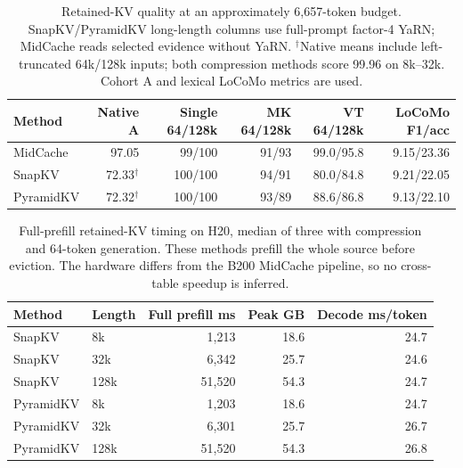 \begin{table}[htbp]
\centering
\small
\setlength{\tabcolsep}{4pt}
\begin{tabular}{@{}lrrrrr@{}}
\toprule
Method & Native A & Single 64/128k & MK 64/128k & VT 64/128k & LoCoMo F1/acc \\
\midrule
MidCache & 97.05 & 99/100 & 91/93 & 99.0/95.8 & 9.15/23.36 \\
SnapKV & 72.33$^\dagger$ & 100/100 & 94/91 & 80.0/84.8 & 9.21/22.05 \\
PyramidKV & 72.32$^\dagger$ & 100/100 & 93/89 & 88.6/86.8 & 9.13/22.10 \\
\bottomrule
\end{tabular}
\caption{Retained-KV quality at an approximately 6,657-token budget. SnapKV/PyramidKV long-length columns use full-prompt factor-4 YaRN; MidCache reads selected evidence without YaRN. $^\dagger$Native means include left-truncated 64k/128k inputs; both compression methods score 99.96 on 8k--32k. Cohort A and lexical LoCoMo metrics are used.}
\label{tab:kv-quality}
\end{table}

\begin{table}[htbp]
\centering
\small
\setlength{\tabcolsep}{4pt}
\begin{tabular}{@{}llrrr@{}}
\toprule
Method & Length & Full prefill ms & Peak GB & Decode ms/token \\
\midrule
SnapKV & 8k & 1,213 & 18.6 & 24.7 \\
SnapKV & 32k & 6,342 & 25.7 & 24.6 \\
SnapKV & 128k & 51,520 & 54.3 & 24.7 \\
PyramidKV & 8k & 1,203 & 18.6 & 24.7 \\
PyramidKV & 32k & 6,301 & 25.7 & 26.7 \\
PyramidKV & 128k & 51,520 & 54.3 & 26.8 \\
\bottomrule
\end{tabular}
\caption{Full-prefill retained-KV timing on H20, median of three with compression and 64-token generation. These methods prefill the whole source before eviction. The hardware differs from the B200 MidCache pipeline, so no cross-table speedup is inferred.}
\label{tab:kv-timing}
\end{table}
